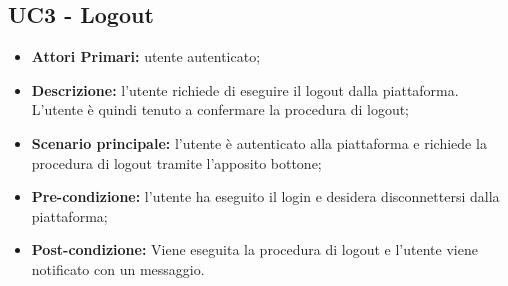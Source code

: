 \subsection{UC3 - Logout}
\begin{itemize}
	\item \textbf{Attori Primari:} utente autenticato;
	\item \textbf{Descrizione:} l'utente richiede di eseguire il logout dalla piattaforma. L'utente è quindi tenuto a confermare la procedura di logout;
	\item \textbf{Scenario principale:} l'utente è autenticato alla piattaforma e richiede la procedura di logout tramite l'apposito bottone;
	\item \textbf{Pre-condizione:} l'utente ha eseguito il login e desidera disconnettersi dalla piattaforma;
	\item \textbf{Post-condizione:} Viene eseguita la procedura di logout e l'utente viene notificato con un messaggio.
\end{itemize}


